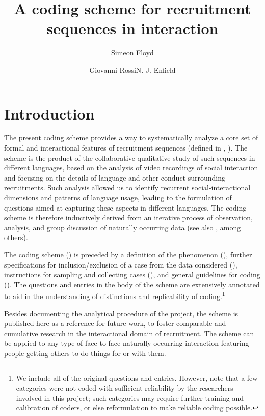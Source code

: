 \documentclass[output=paper]{langsci/langscibook}
\author{Simeon Floyd\affiliation{Department of Anthropology, Universidad San Francisco de Quito}\and Giovanni Rossi\affiliation{Department of Sociology, University of California, Los Angeles}\lastand N. J. Enfield\affiliation{Department of Linguistics, The University of Sydney}}
\title{A coding scheme for recruitment sequences in interaction}
\begin{document}
\maketitle
\label{sec:coding}

\section{Introduction}

The present coding scheme provides a way to systematically analyze a core set of formal and interactional features of recruitment sequences (defined in , ). The scheme is the product of the collaborative qualitative study of such sequences in different languages, based on the analysis of video recordings of social interaction and focusing on the details of language and other conduct surrounding recruitments. Such analysis allowed us to identify recurrent social-interactional dimensions and patterns of language usage, leading to the formulation of questions aimed at capturing these aspects in different languages. The coding scheme is therefore inductively derived from an iterative process of observation, analysis, and group discussion of naturally occurring data (see also \citealt{StiversEnfield2010,DingemanseEtAl2016}, among others).

The coding scheme () is preceded by a definition of the phenomenon (), further specifications for inclusion/exclusion of a case from the data considered (), instructions for sampling and collecting cases (), and general guidelines for coding (). The questions and entries in the body of the scheme are extensively annotated to aid in the understanding of distinctions and replicability of coding.\footnote{We include all of the original questions and entries. However, note that a few categories were not coded with sufficient reliability by the researchers involved in this project; such categories may require further training and calibration of coders, or else reformulation to make reliable coding possible.}

Besides documenting the analytical procedure of the project, the scheme is published here as a reference for future work, to foster comparable and cumulative research in the interactional domain of recruitment. The scheme can be applied to any type of face-to-face naturally occurring interaction featuring people getting others to do things for or with them.
\end{document}
